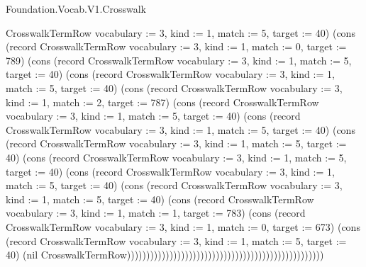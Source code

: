 \begin{lexlean}{Foundation.Vocab.V1.Crosswalk}
\begin{semanticmodule}
{CrosswalkTermRow {vocabulary := 3, kind := 1, match := 5, target := 40}) (cons (record CrosswalkTermRow {vocabulary := 3, kind := 1, match := 0, target := 789}) (cons (record CrosswalkTermRow {vocabulary := 3, kind := 1, match := 5, target := 40}) (cons (record CrosswalkTermRow {vocabulary := 3, kind := 1, match := 5, target := 40}) (cons (record CrosswalkTermRow {vocabulary := 3, kind := 1, match := 2, target := 787}) (cons (record CrosswalkTermRow {vocabulary := 3, kind := 1, match := 5, target := 40}) (cons (record CrosswalkTermRow {vocabulary := 3, kind := 1, match := 5, target := 40}) (cons (record CrosswalkTermRow {vocabulary := 3, kind := 1, match := 5, target := 40}) (cons (record CrosswalkTermRow {vocabulary := 3, kind := 1, match := 5, target := 40}) (cons (record CrosswalkTermRow {vocabulary := 3, kind := 1, match := 5, target := 40}) (cons (record CrosswalkTermRow {vocabulary := 3, kind := 1, match := 5, target := 40}) (cons (record CrosswalkTermRow {vocabulary := 3, kind := 1, match := 1, target := 783}) (cons (record CrosswalkTermRow {vocabulary := 3, kind := 1, match := 0, target := 673}) (cons (record CrosswalkTermRow {vocabulary := 3, kind := 1, match := 5, target := 40}) (nil CrosswalkTermRow)))))))))))))))))))))))))))))))))))))))))))))))))))
}


\end{semanticmodule}
\end{lexlean}
